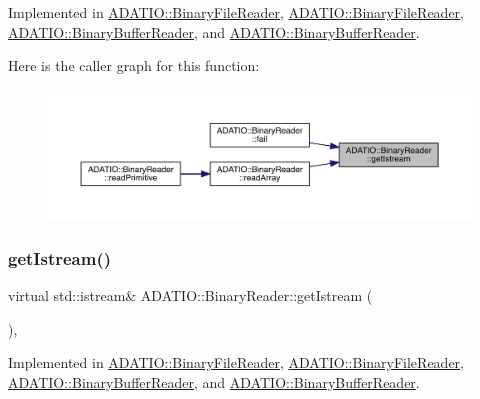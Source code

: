 Implemented in \mbox{\hyperlink{classADATIO_1_1BinaryFileReader_ae0985a1157f9baa87580606cfcf98908}{A\+D\+A\+T\+I\+O\+::\+Binary\+File\+Reader}}, \mbox{\hyperlink{classADATIO_1_1BinaryFileReader_ae0985a1157f9baa87580606cfcf98908}{A\+D\+A\+T\+I\+O\+::\+Binary\+File\+Reader}}, \mbox{\hyperlink{classADATIO_1_1BinaryBufferReader_a32d746446a4c990f3c592a32753d7207}{A\+D\+A\+T\+I\+O\+::\+Binary\+Buffer\+Reader}}, and \mbox{\hyperlink{classADATIO_1_1BinaryBufferReader_a32d746446a4c990f3c592a32753d7207}{A\+D\+A\+T\+I\+O\+::\+Binary\+Buffer\+Reader}}.

Here is the caller graph for this function\+:\nopagebreak
\begin{figure}[H]
\begin{center}
\leavevmode
\includegraphics[width=350pt]{da/dd9/classADATIO_1_1BinaryReader_aa34e73d5f1e6b2b3b48c27e97f6a85a0_icgraph}
\end{center}
\end{figure}
\mbox{\label{classADATIO_1_1BinaryReader_aa34e73d5f1e6b2b3b48c27e97f6a85a0}} 
\subsubsection{\texorpdfstring{getIstream()}{getIstream()}\hspace{0.1cm}{\footnotesize\ttfamily [2/2]}}
{\footnotesize\ttfamily virtual std\+::istream\& A\+D\+A\+T\+I\+O\+::\+Binary\+Reader\+::get\+Istream (\begin{DoxyParamCaption}{ }\end{DoxyParamCaption})\hspace{0.3cm}{\ttfamily [protected]}, {}}



Implemented in \mbox{\hyperlink{classADATIO_1_1BinaryFileReader_ae0985a1157f9baa87580606cfcf98908}{A\+D\+A\+T\+I\+O\+::\+Binary\+File\+Reader}}, \mbox{\hyperlink{classADATIO_1_1BinaryFileReader_ae0985a1157f9baa87580606cfcf98908}{A\+D\+A\+T\+I\+O\+::\+Binary\+File\+Reader}}, \mbox{\hyperlink{classADATIO_1_1BinaryBufferReader_a32d746446a4c990f3c592a32753d7207}{A\+D\+A\+T\+I\+O\+::\+Binary\+Buffer\+Reader}}, and \mbox{\hyperlink{classADATIO_1_1BinaryBufferReader_a32d746446a4c990f3c592a32753d7207}{A\+D\+A\+T\+I\+O\+::\+Binary\+Buffer\+Reader}}.

